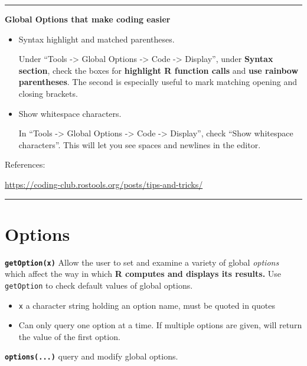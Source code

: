 \documentclass[
  a4paper,
  twoside,
  openright]{book}
\providecommand{\tightlist}{%
  \setlength{\itemsep}{0pt}\setlength{\parskip}{0pt}}
\theoremstyle{definition}
\theoremstyle{definition}
\theoremstyle{definition}
\theoremstyle{definition}
\theoremstyle{remark}
\begin{document}
\begin{center}\rule{0.5\linewidth}{0.5pt}\end{center}

\textbf{Global Options that make coding easier}

\begin{itemize}
\item
  Syntax highlight and matched parentheses.

  Under ``Tools -\textgreater{} Global Options -\textgreater{} Code -\textgreater{} Display'', under \textbf{Syntax section}, check the boxes for \textbf{highlight R function calls} and \textbf{use rainbow parentheses}. The second is especially useful to mark matching opening and closing brackets.
\item
  Show whitespace characters.

  In ``Tools -\textgreater{} Global Options -\textgreater{} Code -\textgreater{} Display'', check ``Show whitespace characters''. This will let you see spaces and newlines in the editor.
\end{itemize}

References:

\url{https://coding-club.rostools.org/posts/tips-and-tricks/}

\begin{center}\rule{0.5\linewidth}{0.5pt}\end{center}

\section{Options}\label{options}

\textbf{\texttt{getOption(x)}} Allow the user to set and examine a variety of global \emph{options} which affect the way in which \textbf{R computes and displays its results.} Use \texttt{getOption} to check default values of global options.

\begin{itemize}
\tightlist
\item
  \texttt{x} a {character string }holding an option name, must be {quoted in quotes}
\item
  Can only query one option at a time. If multiple options are given, will return the value of the first option.
\end{itemize}

\textbf{\texttt{options(...)}} query and modify global options.
\end{document}
